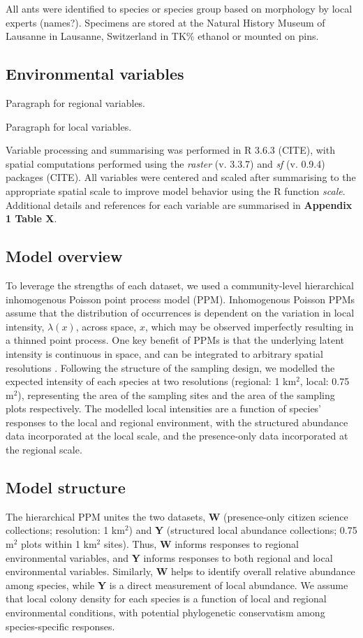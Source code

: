\documentclass[preprint,review,times,12pt]{elsarticle}
\begin{document}
All ants were identified to species or species group based on morphology by local experts (names?). Specimens are stored at the Natural History Museum of Lausanne in Lausanne, Switzerland in TK\% ethanol or mounted on pins. 


\subsection{Environmental variables}
Paragraph for regional variables.

Paragraph for local variables.

Variable processing and summarising was performed in R 3.6.3 (CITE), with spatial computations performed using the \emph{raster} (v. 3.3.7) and \emph{sf} (v. 0.9.4) packages (CITE). All variables were centered and scaled after summarising to the appropriate spatial scale to improve model behavior using the R function \emph{scale}. Additional details and references for each variable are summarised in \textbf{Appendix 1 Table X}.


\subsection{Model overview}
To leverage the strengths of each dataset, we used a community-level hierarchical inhomogenous Poisson point process model (PPM). Inhomogenous Poisson PPMs assume that the distribution of occurrences is dependent on the variation in local intensity, $\lambda(x)$, across space, $x$, which may be observed imperfectly resulting in a thinned point process. One key benefit of PPMs is that the underlying latent intensity is continuous in space, and can be integrated to arbitrary spatial resolutions \citep{Baddeley2015,Hefley2016}. Following the structure of the sampling design, we modelled the expected intensity of each species at two resolutions (regional: 1 km$^2$, local: 0.75 m$^2$), representing the area of the sampling sites and the area of the sampling plots respectively. The modelled local intensities are a function of species' responses to the local and regional environment, with the structured abundance data incorporated at the local scale, and the presence-only data incorporated at the regional scale. 


\subsection{Model structure}
The hierarchical PPM unites the two datasets, \textbf{W} (presence-only citizen science collections; resolution: 1 km$^2$) and \textbf{Y} (structured local abundance collections; 0.75 m$^2$ plots within 1 km$^2$ sites). Thus, \textbf{W} informs responses to regional environmental variables, and  \textbf{Y} informs responses to both regional and local environmental variables. Similarly, \textbf{W} helps to identify overall relative abundance among species, while \textbf{Y} is a direct measurement of local abundance. We assume that local colony density for each species is a function of local and regional environmental conditions, with potential phylogenetic conservatism among species-specific responses.
\end{document}
